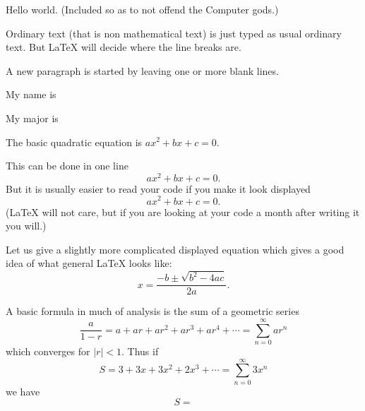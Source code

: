 \documentclass{article}  %
\begin{document}


Hello world.   (Included so as to not offend the Computer gods.)



Ordinary text (that is non mathematical text) is just typed
as usual ordinary text.  But LaTeX will decide where the line
breaks are.

A new paragraph is started by leaving one or more blank lines.

My name is 

My major is 


The basic quadratic equation is \(ax^2 + bx + c =0\).  



This can be done in one line \[ ax^2+bx+c=0. \]
But it is usually easier to read your code if you make it look
displayed 
\[
  ax^2+bx+c=0.
\]
(LaTeX will not care, but if you are looking at your code a month after
writing it you will.)

Let us give a slightly more complicated displayed equation
which gives a good idea of what general LaTeX looks like:
\[
	x = \frac{-b \pm \sqrt{b^2-4ac}}{2a}.
\]

A basic formula in much of analysis is the sum of a geometric 
series
\[
   \frac{a}{1-r}= a+ar + ar^2 + ar^3 + ar^4+ \cdots = \sum_{n=0}^\infty ar^n
\]
which converges for $|r|<1$.
Thus if
\[
	S = 3 + 3 x + 3 x^2 + 2 x^3 + \cdots = \sum_{n=0}^\infty 3x^n
\]
we have
\[
  S =     %
\]
\end{document}
